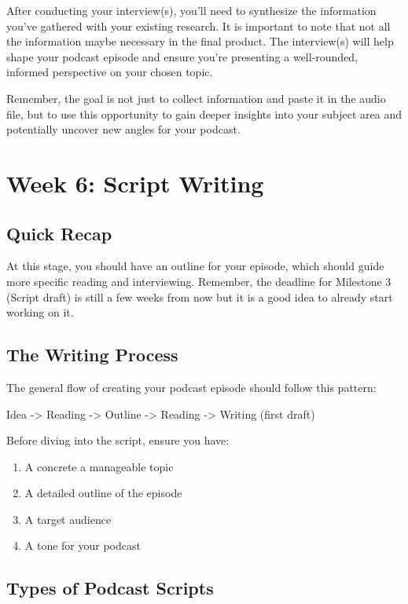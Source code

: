 \documentclass[
  letterpaper,
  DIV=11,
  numbers=noendperiod]{scrreprt}
\providecommand{\tightlist}{%
  \setlength{\itemsep}{0pt}\setlength{\parskip}{0pt}}\usepackage{longtable,booktabs,array}
\begin{document}
After conducting your interview(s), you'll need to synthesize the
information you've gathered with your existing research. It is important
to note that not all the information maybe necessary in the final
product. The interview(s) will help shape your podcast episode and
ensure you're presenting a well-rounded, informed perspective on your
chosen topic.

Remember, the goal is not just to collect information and paste it in
the audio file, but to use this opportunity to gain deeper insights into
your subject area and potentially uncover new angles for your podcast.

\chapter{Week 6: Script Writing}\label{week-6-script-writing}

\section{Quick Recap}\label{quick-recap-1}

At this stage, you should have an outline for your episode, which should
guide more specific reading and interviewing. Remember, the deadline for
Milestone 3 (Script draft) is still a few weeks from now but it is a
good idea to already start working on it.

\section{The Writing Process}\label{the-writing-process}

The general flow of creating your podcast episode should follow this
pattern:

Idea -\textgreater{} Reading -\textgreater{} Outline -\textgreater{}
Reading -\textgreater{} Writing (first draft)

Before diving into the script, ensure you have:

\begin{enumerate}
\def\labelenumi{\arabic{enumi}.}
\tightlist
\item
  A concrete a manageable topic
\item
  A detailed outline of the episode
\item
  A target audience
\item
  A tone for your podcast
\end{enumerate}

\section{Types of Podcast Scripts}\label{types-of-podcast-scripts}
\end{document}
